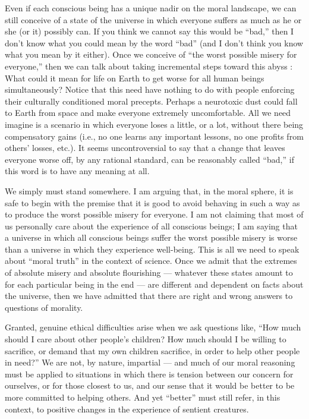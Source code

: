 \documentclass[a4paper,14pt]{extarticle}
\begin{document}
Even if each conscious being has a unique nadir on the moral landscape, we can still conceive of a state of the universe in which everyone suffers as much as he or she (or it) possibly can.
If you think we cannot say this would be ``bad,'' then I don't know what you could mean by the word ``bad'' (and I don't think you know what you mean by it either).
Once we conceive of ``the worst possible misery for everyone,'' then we can talk about taking incremental steps toward this abyss :
What could it mean for life on Earth to get worse for all human beings simultaneously?
Notice that this need have nothing to do with people enforcing their culturally conditioned moral precepts.
Perhaps a neurotoxic dust could fall to Earth from space and make everyone extremely uncomfortable.
All we need imagine is a scenario in which everyone loses a little, or a lot, without there being compensatory gains (i.e., no one learns any important lessons, no one profits from others' losses, etc.).
It seems uncontroversial to say that a change that leaves everyone worse off, by any rational standard, can be reasonably called ``bad,'' if this word is to have any meaning at all.

We simply must stand somewhere. I am arguing that, in the moral sphere, it is safe to begin with the premise that it is good to avoid behaving in such a way as to produce the worst possible misery for everyone.
I am not claiming that most of us personally care about the experience of all conscious beings;
I am saying that a universe in which all conscious beings suffer the worst possible misery is worse than a universe in which they experience well-being.
This is all we need to speak about ``moral truth'' in the context of science.
Once we admit that the extremes of absolute misery and absolute flourishing --- whatever these states amount to for each particular being in the end --- are different and dependent on facts about the universe, then we have admitted that there are right and wrong answers to questions of morality.

Granted, genuine ethical difficulties arise when we ask questions like, ``How much should I care about other people's children?
How much should I be willing to sacrifice, or demand that my own children sacrifice, in order to help other people in need?''
We are not, by nature, impartial --- and much of our moral reasoning must be applied to situations in which there is tension between our concern for ourselves, or for those closest to us, and our sense that it would be better to be more committed to helping others.
And yet ``better'' must still refer, in this context, to positive changes in the experience of sentient creatures.
\end{document}
